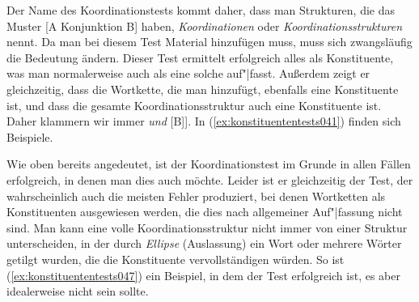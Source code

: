 
Der Name des Koordinationstests kommt daher, dass man Strukturen, die das Muster [A Konjunktion B] haben, \textit{Koordinationen} oder \textit{Koordinationsstrukturen} nennt.
Da man bei diesem Test Material hinzufügen muss, muss sich zwangsläufig die Bedeutung ändern.
Dieser Test ermittelt erfolgreich alles als Konstituente, was man normalerweise auch als eine solche auf"|fasst.
Außerdem zeigt er gleichzeitig, dass die Wortkette, die man hinzufügt, ebenfalls eine Konstituente ist, und dass die gesamte Koordinationsstruktur auch eine Konstituente ist.
Daher klammern wir immer \zB [[A] \textit{und} [B]].
In (\ref{ex:konstituententests041}) finden sich Beispiele.

\begin{exe}
  \ex\label{ex:konstituententests041}
  \begin{xlist}
  \end{xlist}
\end{exe}

\label{abs:koordinationstest}Wie oben bereits angedeutet, ist der Koordinationstest im Grunde in allen Fällen erfolgreich, in denen man dies auch möchte.
Leider ist er gleichzeitig der Test, der wahrscheinlich auch die meisten Fehler produziert, bei denen Wortketten als Konstituenten ausgewiesen werden, die dies nach allgemeiner Auf"|fassung nicht sind.
Man kann eine volle Koordinationsstruktur nicht immer von einer Struktur unterscheiden, in der durch \textit{Ellipse} (Auslassung) ein Wort oder mehrere Wörter getilgt wurden, die die Konstituente vervollständigen würden.
So ist \zB (\ref{ex:konstituententests047}) ein Beispiel, in dem der Test erfolgreich ist, es aber idealerweise nicht sein sollte.

